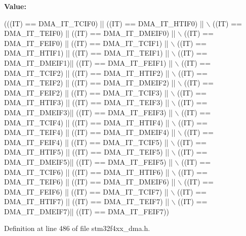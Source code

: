 {\bfseries Value\+:}
\begin{DoxyCode}
(((IT) == DMA\_IT\_TCIF0) || ((IT) == DMA\_IT\_HTIF0)  || \(\backslash\)
                           ((IT) == DMA\_IT\_TEIF0) || ((IT) == DMA\_IT\_DMEIF0) || \(\backslash\)
                           ((IT) == DMA\_IT\_FEIF0) || ((IT) == DMA\_IT\_TCIF1)  || \(\backslash\)
                           ((IT) == DMA\_IT\_HTIF1) || ((IT) == DMA\_IT\_TEIF1)  || \(\backslash\)
                           ((IT) == DMA\_IT\_DMEIF1)|| ((IT) == DMA\_IT\_FEIF1)  || \(\backslash\)
                           ((IT) == DMA\_IT\_TCIF2) || ((IT) == DMA\_IT\_HTIF2)  || \(\backslash\)
                           ((IT) == DMA\_IT\_TEIF2) || ((IT) == DMA\_IT\_DMEIF2) || \(\backslash\)
                           ((IT) == DMA\_IT\_FEIF2) || ((IT) == DMA\_IT\_TCIF3)  || \(\backslash\)
                           ((IT) == DMA\_IT\_HTIF3) || ((IT) == DMA\_IT\_TEIF3)  || \(\backslash\)
                           ((IT) == DMA\_IT\_DMEIF3)|| ((IT) == DMA\_IT\_FEIF3)  || \(\backslash\)
                           ((IT) == DMA\_IT\_TCIF4) || ((IT) == DMA\_IT\_HTIF4)  || \(\backslash\)
                           ((IT) == DMA\_IT\_TEIF4) || ((IT) == DMA\_IT\_DMEIF4) || \(\backslash\)
                           ((IT) == DMA\_IT\_FEIF4) || ((IT) == DMA\_IT\_TCIF5)  || \(\backslash\)
                           ((IT) == DMA\_IT\_HTIF5) || ((IT) == DMA\_IT\_TEIF5)  || \(\backslash\)
                           ((IT) == DMA\_IT\_DMEIF5)|| ((IT) == DMA\_IT\_FEIF5)  || \(\backslash\)
                           ((IT) == DMA\_IT\_TCIF6) || ((IT) == DMA\_IT\_HTIF6)  || \(\backslash\)
                           ((IT) == DMA\_IT\_TEIF6) || ((IT) == DMA\_IT\_DMEIF6) || \(\backslash\)
                           ((IT) == DMA\_IT\_FEIF6) || ((IT) == DMA\_IT\_TCIF7)  || \(\backslash\)
                           ((IT) == DMA\_IT\_HTIF7) || ((IT) == DMA\_IT\_TEIF7)  || \(\backslash\)
                           ((IT) == DMA\_IT\_DMEIF7)|| ((IT) == DMA\_IT\_FEIF7))
\end{DoxyCode}


Definition at line 486 of file stm32f4xx\+\_\+dma.\+h.

